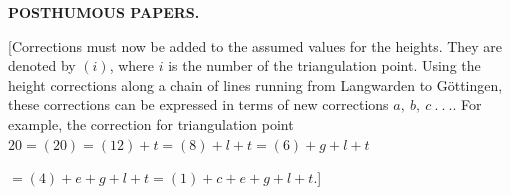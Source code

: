 \par\clearpage
\noindent{}\hfill{\small\textbf{POSTHUMOUS PAPERS.}}\hfill\null\par\medskip
\par\noindent\hspace*{\parindent}[Corrections must now be added to the assumed values for the heights.
They are denoted by \((i)\), where \(i\) is the number of the triangulation point.
Using the height corrections along a chain of lines
running from Langwarden to Göttingen, these corrections can be expressed in terms of new corrections
\(a,\ b,\ c\ .\ .\ .\). For example, the correction for triangulation point
\(20=(20)=(12)+t=(8)+l+t=(6)+g+l+t\)
\par\noindent\hfill \(=(4)+e+g+l+t=(1)+c+e+g+l+t.\)]
\par\medskip
